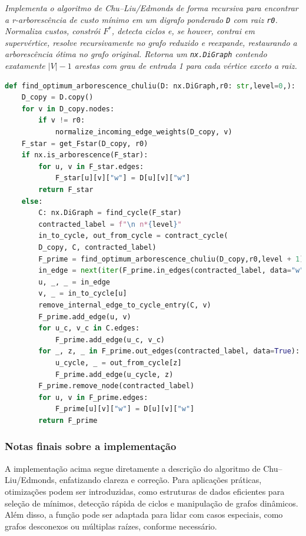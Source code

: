 \begin{tcolorbox}[
        enhanced, breakable,
        colframe=blue!60!black, colback=blue!2,
        colbacktitle=blue!15, coltitle=black,
        title={Procedimento principal (recursivo)},
        boxed title style={sharp corners, boxrule=0.6pt},
        sharp corners, boxrule=0.6pt
    ]
    \emph{Implementa o algoritmo de Chu–Liu/Edmonds de forma recursiva para encontrar a r-arborescência de custo mínimo em um digrafo ponderado \texttt{D} com raiz \texttt{r0}. Normaliza custos, constrói $F^*$, detecta ciclos e, se houver, contrai em supervértice, resolve recursivamente no grafo reduzido e reexpande, restaurando a arborescência ótima no grafo original. Retorna um \texttt{nx.DiGraph} contendo exatamente $|V|-1$ arestas com grau de entrada 1 para cada vértice exceto a raiz.}
    \tcblower
    \begin{lstlisting}[mathescape=true, language=Python]
def find_optimum_arborescence_chuliu(D: nx.DiGraph,r0: str,level=0,):
    D_copy = D.copy()
    for v in D_copy.nodes:
        if v != r0:
            normalize_incoming_edge_weights(D_copy, v)
    F_star = get_Fstar(D_copy, r0)
    if nx.is_arborescence(F_star):
        for u, v in F_star.edges:
            F_star[u][v]["w"] = D[u][v]["w"]
        return F_star
    else:
        C: nx.DiGraph = find_cycle(F_star)   
        contracted_label = f"\n n*{level}"
        in_to_cycle, out_from_cycle = contract_cycle(
        D_copy, C, contracted_label)
        F_prime = find_optimum_arborescence_chuliu(D_copy,r0,level + 1)
        in_edge = next(iter(F_prime.in_edges(contracted_label, data="w")), None)
        u, _, _ = in_edge
        v, _ = in_to_cycle[u]
        remove_internal_edge_to_cycle_entry(C, v)
        F_prime.add_edge(u, v)
        for u_c, v_c in C.edges:
            F_prime.add_edge(u_c, v_c)
        for _, z, _ in F_prime.out_edges(contracted_label, data=True):
            u_cycle, _ = out_from_cycle[z]
            F_prime.add_edge(u_cycle, z)
        F_prime.remove_node(contracted_label)
        for u, v in F_prime.edges:
            F_prime[u][v]["w"] = D[u][v]["w"]
        return F_prime 
\end{lstlisting}
\end{tcolorbox}

\subsubsection{Notas finais sobre a implementação}

A implementação acima segue diretamente a descrição do algoritmo de Chu–Liu/Edmonds, enfatizando clareza e correção. Para aplicações práticas, otimizações podem ser introduzidas, como estruturas de dados eficientes para seleção de mínimos, detecção rápida de ciclos e manipulação de grafos dinâmicos. Além disso, a função pode ser adaptada para lidar com casos especiais, como grafos desconexos ou múltiplas raízes, conforme necessário.


